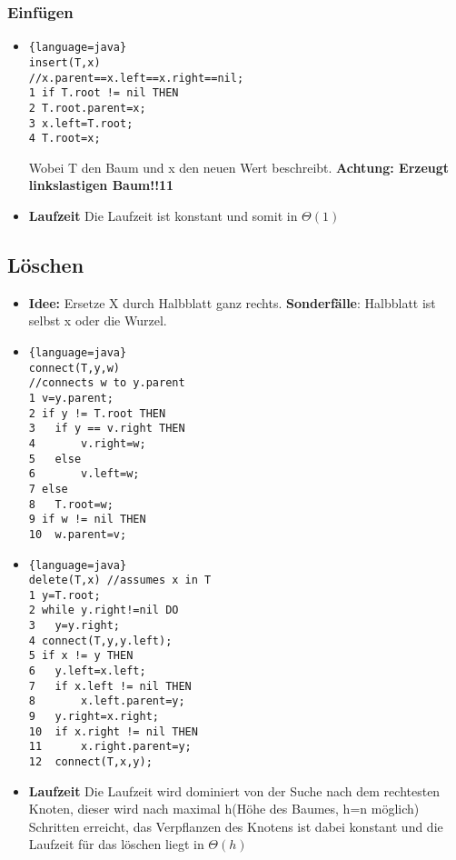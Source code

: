\documentclass[jou,apacite]{apa6}
\begin{document}
    \subsubsection{Einfügen}
    \begin{itemize}
        \item 
        \begin{lstlisting}{language=java}
insert(T,x)
//x.parent==x.left==x.right==nil;
1 if T.root != nil THEN
2 T.root.parent=x;
3 x.left=T.root;
4 T.root=x;
        \end{lstlisting}
        Wobei T den Baum und x den neuen Wert beschreibt.
        {\bfseries Achtung: Erzeugt linkslastigen Baum!!11}
        \item {\bfseries Laufzeit} Die Laufzeit ist konstant und somit in $\Theta(1)$
    \end{itemize}
    
    \subsection{Löschen}
    \begin{itemize}
        \item {\bfseries Idee:} Ersetze X durch Halbblatt ganz rechts. {\bfseries Sonderfälle}: Halbblatt ist selbst x oder die Wurzel.
        \item 
        \begin{lstlisting}{language=java}
connect(T,y,w)
//connects w to y.parent
1 v=y.parent;
2 if y != T.root THEN
3   if y == v.right THEN
4       v.right=w;
5   else
6       v.left=w;
7 else
8   T.root=w;
9 if w != nil THEN
10  w.parent=v;
        \end{lstlisting}
        \item 
        \begin{lstlisting}{language=java}
delete(T,x) //assumes x in T
1 y=T.root;
2 while y.right!=nil DO
3   y=y.right;
4 connect(T,y,y.left);
5 if x != y THEN
6   y.left=x.left;
7   if x.left != nil THEN
8       x.left.parent=y;
9   y.right=x.right;
10  if x.right != nil THEN
11      x.right.parent=y;
12  connect(T,x,y);
        \end{lstlisting}
        \item {\bfseries Laufzeit} Die Laufzeit wird dominiert von der Suche nach dem rechtesten Knoten, dieser wird nach maximal h(Höhe des Baumes, h=n möglich) Schritten erreicht, das Verpflanzen des Knotens ist dabei konstant und die Laufzeit für das löschen liegt in $\Theta(h)$
    \end{itemize}
    
\end{document}
